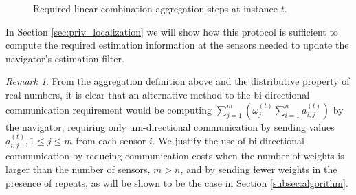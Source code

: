 \documentclass[10pt,letterpaper,oneside,twocolumn,journal]{IEEEtran}
\theoremstyle{definition}
\theoremstyle{definition}
\theoremstyle{remark}
\newtheorem*{remark}{Remark}
\begin{document}
\begin{figure}[htbp]
\vspace{\baselineskip}
\caption{Required linear-combination aggregation steps at instance $t$.}
\label{fig:agg_steps}
\end{figure}

In Section \ref{sec:priv_localization} we will show how this protocol is sufficient to compute the required estimation information at the sensors needed to update the navigator's estimation filter.

\begin{remark}
    From the aggregation definition above and the distributive property of real numbers, it is clear that an alternative method to the bi-directional communication requirement would be computing $\sum^{m}_{j=1}(\omega_j^{(t)}\sum^{n}_{i=1} a_{i,j}^{(t)})$ by the navigator, requiring only uni-directional communication by sending values $a_{i,j}^{(t)}, 1 \leq j \leq m$ from each sensor $i$. We justify the use of bi-directional communication by reducing communication costs when the number of weights is larger than the number of sensors, $m>n$, and by sending fewer weights in the presence of repeats, as will be shown to be the case in Section \ref{subsec:algorithm}.
\end{remark}

% 
% 
\end{document}
